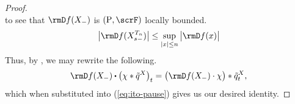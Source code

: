 \begin{proof}
\begin{equation}
  \end{equation}
  to see that $\Der f(\X_-)$ is $(\Prb, \scrF)$ locally bounded.
  \begin{equation*}
    \big|\Der f(\X^{T_n}_{s-})\big| \leq \sup_{|\stateVar| \leq n} \big| \Der f(\stateVar) \big|
  \end{equation*}
  Thus, by \cite[Proposition II.1.30]{jacod2003}, we may rewrite the following.
  \begin{equation*}
    \Der f(\X_-) \shortInt \big( \trunc \ast \compensate{\jumpMeas^\X} \big)_t 
    = \big( \Der f(\X_-) \cdot \trunc \big) \ast \compensate{\jumpMeas^\X}_t ,
  \end{equation*}
  which when substituted into (\ref{eq:ito-pause}) gives us our desired identity.
\end{proof}

